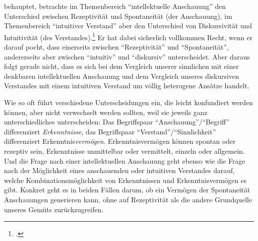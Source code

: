  behauptet,
 betrachte im Themenbereich \enquote{intellektuelle
Anschauung} den Unterschied zwischen Rezeptivität und Spontaneität (der
Anschauung), im Themenbereich \enquote{intuitiver Verstand} aber den Unterschied
von Diskursivität und Intuitivität (des
Verstandes).\footcite[Vgl.][177]{Foerster:DieBedeutungvonSS7677deremphKritikderUrteilskraftfuerdieEntwicklungdernachkantischenPhilosophieTeil12002}
Er hat dabei sicherlich vollkommen Recht, wenn er darauf pocht, dass
 einerseits zwischen \enquote{Rezeptivität} und
\enquote{Spontaneität}, andererseits aber zwischen \enquote{intuitiv} und
\enquote{diskursiv} unterscheidet. Aber daraus folgt gerade nicht, dass es sich
bei dem Vergleich unserer sinnlichen mit einer denkbaren intellektuellen
Anschauung und dem Vergleich unseres diskursiven Verstandes mit einem intuitiven
Verstand um völlig heterogene Ansätze handelt.

Wie so oft führt  verschiedene Unterscheidungen ein, die
leicht konfundiert werden können, aber nicht verwechselt werden sollten, weil sie
jeweils ganz unterschiedliches unterscheiden: Das Begriffspaar
\enquote{Anschauung}/\enquote{Begriff} differenziert \emph{Erkenntnisse}, das
Begriffspaar \enquote{Verstand}/\enquote{Sinnlichkeit} differenziert
Erkenntnis\emph{vermögen}. Erkenntnisvermögen können spontan oder rezeptiv sein,
Erkenntnisse unmittelbar oder vermittelt, einzeln oder allgemein. Und die Frage nach einer intellektuellen
Anschauung geht ebenso wie die Frage nach der Möglichkeit eines anschauenden
oder intuitiven Verstandes darauf, welche Kombinationsmöglichkeit von
Erkenntnissen und Erkenntnisvermögen es gibt. Konkret geht es in beiden Fällen
darum, ob ein Vermögen der Spontaneität Anschauungen generieren kann, ohne auf
Rezeptivität als die andere Grundquelle unseres Gemüts zurückzugreifen.

